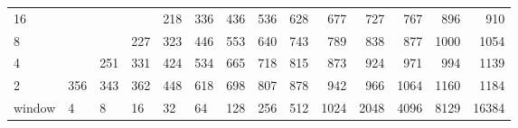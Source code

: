 \begin{table}[h]
{\begin{tabular}{lrrrrrrrrrrrrr}
			\multicolumn{1}{|l|}{16} &  &  &  & \cellcolor[HTML]{99E600}218 & \cellcolor[HTML]{99E600}336 & \cellcolor[HTML]{E69900}436 & \cellcolor[HTML]{E69900}536 & \cellcolor[HTML]{E60000}628 & \cellcolor[HTML]{E60000}677 & \cellcolor[HTML]{E60000}727 & \cellcolor[HTML]{E60000}767 & \cellcolor[HTML]{9900E6}896 & \cellcolor[HTML]{4C00E6}910 \\ \cline{1-1}
			\multicolumn{1}{|l|}{8} &  &  & \cellcolor[HTML]{99E600}227 & \cellcolor[HTML]{99E600}323 & \cellcolor[HTML]{E69900}446 & \cellcolor[HTML]{E69900}553 & \cellcolor[HTML]{E60000}640 & \cellcolor[HTML]{E60000}743 & \cellcolor[HTML]{9900E6}789 & \cellcolor[HTML]{9900E6}838 & \cellcolor[HTML]{9900E6}877 & \cellcolor[HTML]{4C00E6}1000 & \cellcolor[HTML]{4C00E6}1054 \\ \cline{1-1}
			\multicolumn{1}{|l|}{4} &  & \cellcolor[HTML]{99E600}251 & \cellcolor[HTML]{99E600}331 & \cellcolor[HTML]{E69900}424 & \cellcolor[HTML]{E69900}534 & \cellcolor[HTML]{E60000}665 & \cellcolor[HTML]{E60000}718 & \cellcolor[HTML]{9900E6}815 & \cellcolor[HTML]{9900E6}873 & \cellcolor[HTML]{9900E6}924 & \cellcolor[HTML]{9900E6}971 & \cellcolor[HTML]{4C00E6}994 & \cellcolor[HTML]{4C00E6}1139 \\ \cline{1-1}
			\multicolumn{1}{|l|}{2} & \cellcolor[HTML]{E69900}356 & \cellcolor[HTML]{99E600}343 & \cellcolor[HTML]{E69900}362 & \cellcolor[HTML]{E69900}448 & \cellcolor[HTML]{E60000}618 & \cellcolor[HTML]{E60000}698 & \cellcolor[HTML]{9900E6}807 & \cellcolor[HTML]{9900E6}878 & \cellcolor[HTML]{9900E6}942 & \cellcolor[HTML]{4C00E6}966 & \cellcolor[HTML]{4C00E6}1064 & \cellcolor[HTML]{4C00E6}1160 & \cellcolor[HTML]{4C00E6}1184 \\ \cline{1-1}
			\multicolumn{1}{l|}{window} & \multicolumn{1}{l|}{4} & \multicolumn{1}{l|}{8} & \multicolumn{1}{l|}{16} & \multicolumn{1}{l|}{32} & \multicolumn{1}{l|}{64} & \multicolumn{1}{l|}{128} & \multicolumn{1}{l|}{256} & \multicolumn{1}{l|}{512} & \multicolumn{1}{l|}{1024} & \multicolumn{1}{l|}{2048} & \multicolumn{1}{l|}{4096} & \multicolumn{1}{l|}{8129} & \multicolumn{1}{l|}{16384} \\ \cline{2-14}
		\end{tabular}
	}
\end{table}

